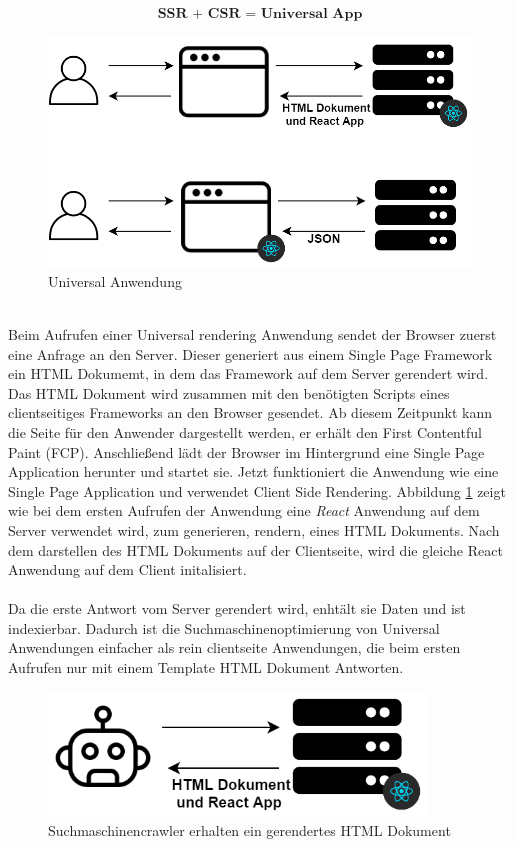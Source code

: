 \documentclass[runningheads]{llncs}
\numberwithin{figure}{section}
\begin{document}
\begin{equation*}
  \textbf{SSR + CSR = Universal App}
\end{equation*}
\begin{figure}[h]
  \centering
  \includegraphics[width=12cm]{images/react}
  \caption{Universal Anwendung}
  \label{Universal Anwendung}
\end{figure}
\\
Beim Aufrufen einer Universal rendering Anwendung sendet der Browser
zuerst eine Anfrage an den Server. 
Dieser generiert aus einem Single Page Framework ein HTML Dokumemt,
in dem das Framework auf dem Server gerendert wird. 
Das HTML Dokument wird zusammen mit den benötigten Scripts eines clientseitiges Frameworks
an den Browser gesendet.
Ab diesem Zeitpunkt kann die Seite für den Anwender dargestellt werden, 
er erhält den First Contentful Paint (FCP). 
Anschließend lädt der Browser im Hintergrund eine Single Page Application herunter
und startet sie. 
Jetzt funktioniert die Anwendung wie eine Single Page Application und 
verwendet Client Side Rendering. Abbildung \ref{Universal Anwendung} zeigt wie bei dem 
ersten Aufrufen der Anwendung eine \textit{React} Anwendung auf dem Server verwendet wird,
zum generieren, rendern, eines HTML Dokuments. 
Nach dem darstellen des HTML Dokuments auf der Clientseite, 
wird die gleiche React Anwendung auf dem Client initalisiert.
\\
\\
Da die erste Antwort vom Server gerendert wird, enhtält sie Daten und ist
indexierbar. Dadurch ist die Suchmaschinenoptimierung von Universal Anwendungen einfacher
als rein clientseite Anwendungen, die beim ersten Aufrufen nur mit einem Template
HTML Dokument Antworten.
\begin{figure}[h]
  \centering
  \includegraphics[width=10cm]{images/universalseo}
  \caption{Suchmaschinencrawler erhalten ein gerendertes HTML Dokument}
  \label{Suchmaschinencrawler erhalten ein gerendertes HTML Dokument}
\end{figure}
\end{document}
